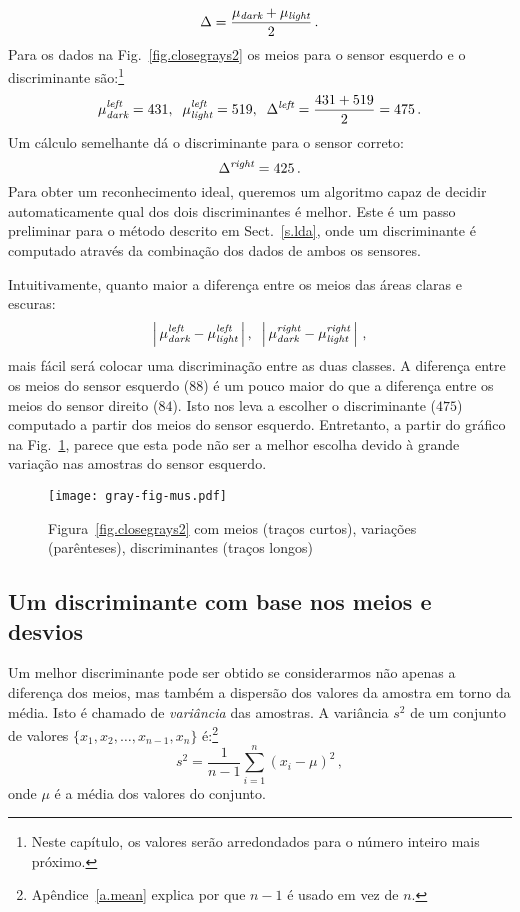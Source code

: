 \begin{displaymath}
\Delta = \frac{\mu_{\sub{dark}} + \mu_{\sub{light}}}{2}\,.%
\end{displaymath}
Para os dados na Fig.~\ref{fig.closegrays2} os meios para o sensor esquerdo e o discriminante são:\footnote{Neste capítulo, os valores serão arredondados para o número inteiro mais próximo.}
\[
\mu_{\textit{\scriptsize dark}}^{\textit{\scriptsize left}} = 431,\;\;
\mu_{\textit{\scriptsize light}}^{\textit{\scriptsize left}} = 519,\;\;
\Delta^{\textit{\scriptsize left}} = \frac{431+519}{2} = 475\,.
\]
Um cálculo semelhante dá o discriminante para o sensor correto:
\[
\Delta^{\textit{\scriptsize right}} = 425\,.
\]
Para obter um reconhecimento ideal, queremos um algoritmo capaz de decidir automaticamente qual dos dois discriminantes é melhor. Este é um passo preliminar para o método descrito em Sect.~\ref{s.lda}, onde um discriminante é computado através da combinação dos dados de ambos os sensores.

Intuitivamente, quanto maior a diferença entre os meios das áreas claras e escuras:
\[
\left|\,\mu_{\textit{\scriptsize dark}}^{\textit{\scriptsize left}} - \mu_{\textit{\scriptsize light}}^{\textit{\scriptsize left}}\,\right|,\;\;\left|\,\mu_{\textit{\scriptsize dark}}^{\textit{\scriptsize right}} - \mu_{\textit{\scriptsize light}}^{\textit{\scriptsize right}}\,\right|\,,
\]
mais fácil será colocar uma discriminação entre as duas classes. A diferença entre os meios do sensor esquerdo ($88$) é um pouco maior do que a diferença entre os meios do sensor direito ($84$). Isto nos leva a escolher o discriminante ($475$) computado a partir dos meios do sensor esquerdo. Entretanto, a partir do gráfico na Fig.~\ref{fig.closegraysmus}, parece que esta pode não ser a melhor escolha devido à grande variação nas amostras do sensor esquerdo.

\begin{figure}
\begin{center}
\texttt{[image: gray-fig-mus.pdf]}
\end{center}
\caption{Figura~\ref{fig.closegrays2} com meios (traços curtos), variações (parênteses), discriminantes (traços longos)}\label{fig.closegraysmus}
\end{figure}

\subsection{Um discriminante com base nos meios e desvios}

Um melhor discriminante pode ser obtido se considerarmos não apenas a diferença dos meios, mas também a dispersão dos valores da amostra em torno da média. Isto é chamado de \emph{variância} das amostras. A variância $s^2$ de um conjunto de valores $\{x_1,x_2,\ldots,x_{n-1},x_n\}$ é:\footnote{Apêndice~\ref{a.mean} explica por que $n-1$ é usado em vez de $n$.}
\[
s^2 = \frac{1}{n-1} \sum_{i=1}^n (x_i-\mu)^2\,,
\]
onde $\mu$ é a média dos valores do conjunto.

